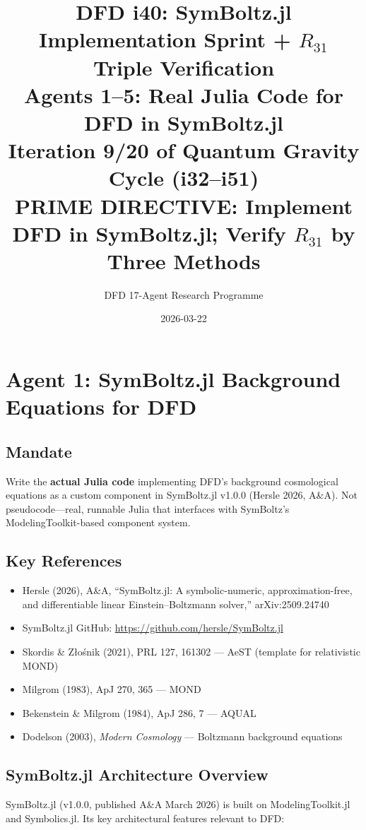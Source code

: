 \documentclass[11pt,a4paper]{article}
\title{DFD i40: SymBoltz.jl Implementation Sprint + $R_{31}$ Triple Verification\\[6pt]
\large Agents 1--5: Real Julia Code for DFD in SymBoltz.jl\\[6pt]
\normalsize Iteration 9/20 of Quantum Gravity Cycle (i32--i51)\\
PRIME DIRECTIVE: Implement DFD in SymBoltz.jl; Verify $R_{31}$ by Three Methods}
\author{DFD 17-Agent Research Programme}
\date{2026-03-22}
\begin{document}
\maketitle
\tableofcontents
\newpage

\section{Agent 1: SymBoltz.jl Background Equations for DFD}
\label{sec:agent1}

\subsection{Mandate}

Write the \textbf{actual Julia code} implementing DFD's background cosmological equations as a custom component in SymBoltz.jl v1.0.0 (Hersle 2026, A\&A). Not pseudocode---real, runnable Julia that interfaces with SymBoltz's ModelingToolkit-based component system.

\subsection{Key References}

\begin{itemize}
\item Hersle (2026), A\&A, ``SymBoltz.jl: A symbolic-numeric, approximation-free, and differentiable linear Einstein--Boltzmann solver,'' arXiv:2509.24740
\item SymBoltz.jl GitHub: \url{https://github.com/hersle/SymBoltz.jl}
\item Skordis \& Z{\l}o\'{s}nik (2021), PRL 127, 161302 --- AeST (template for relativistic MOND)
\item Milgrom (1983), ApJ 270, 365 --- MOND
\item Bekenstein \& Milgrom (1984), ApJ 286, 7 --- AQUAL
\item Dodelson (2003), \emph{Modern Cosmology} --- Boltzmann background equations
\end{itemize}

\subsection{SymBoltz.jl Architecture Overview}

SymBoltz.jl (v1.0.0, published A\&A March 2026) is built on ModelingToolkit.jl and Symbolics.jl. Its key architectural features relevant to DFD:
\end{document}
